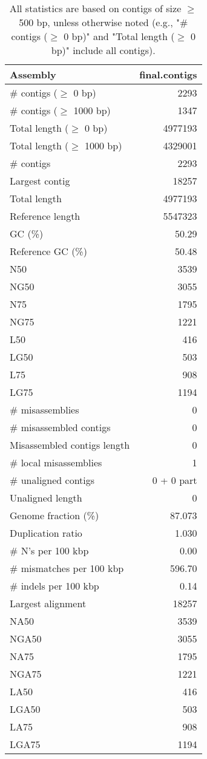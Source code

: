 \documentclass[12pt,a4paper]{article}
\begin{document}
\begin{table}[ht]
\begin{center}
\caption{All statistics are based on contigs of size $\geq$ 500 bp, unless otherwise noted (e.g., "\# contigs ($\geq$ 0 bp)" and "Total length ($\geq$ 0 bp)" include all contigs).}
\begin{tabular}{|l*{1}{|r}|}
\hline
Assembly & final.contigs \\ \hline
\# contigs ($\geq$ 0 bp) & 2293 \\ \hline
\# contigs ($\geq$ 1000 bp) & 1347 \\ \hline
Total length ($\geq$ 0 bp) & 4977193 \\ \hline
Total length ($\geq$ 1000 bp) & 4329001 \\ \hline
\# contigs & 2293 \\ \hline
Largest contig & 18257 \\ \hline
Total length & 4977193 \\ \hline
Reference length & 5547323 \\ \hline
GC (\%) & 50.29 \\ \hline
Reference GC (\%) & 50.48 \\ \hline
N50 & 3539 \\ \hline
NG50 & 3055 \\ \hline
N75 & 1795 \\ \hline
NG75 & 1221 \\ \hline
L50 & 416 \\ \hline
LG50 & 503 \\ \hline
L75 & 908 \\ \hline
LG75 & 1194 \\ \hline
\# misassemblies & 0 \\ \hline
\# misassembled contigs & 0 \\ \hline
Misassembled contigs length & 0 \\ \hline
\# local misassemblies & 1 \\ \hline
\# unaligned contigs & 0 + 0 part \\ \hline
Unaligned length & 0 \\ \hline
Genome fraction (\%) & 87.073 \\ \hline
Duplication ratio & 1.030 \\ \hline
\# N's per 100 kbp & 0.00 \\ \hline
\# mismatches per 100 kbp & 596.70 \\ \hline
\# indels per 100 kbp & 0.14 \\ \hline
Largest alignment & 18257 \\ \hline
NA50 & 3539 \\ \hline
NGA50 & 3055 \\ \hline
NA75 & 1795 \\ \hline
NGA75 & 1221 \\ \hline
LA50 & 416 \\ \hline
LGA50 & 503 \\ \hline
LA75 & 908 \\ \hline
LGA75 & 1194 \\ \hline
\end{tabular}
\end{center}
\end{table}
\end{document}
